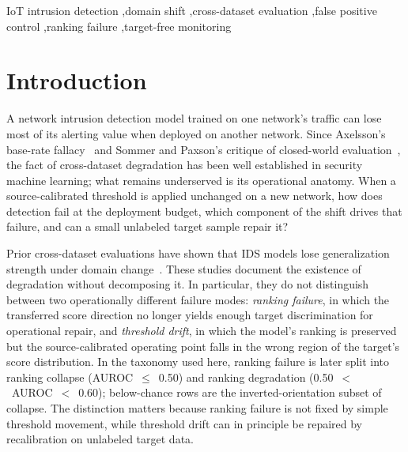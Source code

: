 \documentclass[preprint,12pt]{elsarticle}
\begin{document}
\begin{frontmatter}
\begin{keyword}
IoT intrusion detection \sep domain shift \sep cross-dataset evaluation \sep false positive control \sep ranking failure \sep target-free monitoring
\end{keyword}

\end{frontmatter}

\section{Introduction}

A network intrusion detection model trained on one network's traffic can lose most of its alerting value when deployed on another network. Since Axelsson's base-rate fallacy~\cite{axelsson2000baserate} and Sommer and Paxson's critique of closed-world evaluation~\cite{sommer2010outside}, the fact of cross-dataset degradation has been well established in security machine learning; what remains underserved is its operational anatomy. When a source-calibrated threshold is applied unchanged on a new network, how does detection fail at the deployment budget, which component of the shift drives that failure, and can a small unlabeled target sample repair it?

Prior cross-dataset evaluations have shown that IDS models lose generalization strength under domain change~\cite{dhooge2020inter,layeghy2024benchmarking,iwanowski2025choice}. These studies document the existence of degradation without decomposing it. In particular, they do not distinguish between two operationally different failure modes: \emph{ranking failure}, in which the transferred score direction no longer yields enough target discrimination for operational repair, and \emph{threshold drift}, in which the model's ranking is preserved but the source-calibrated operating point falls in the wrong region of the target's score distribution. In the taxonomy used here, ranking failure is later split into ranking collapse (AUROC~$\leq$~0.50) and ranking degradation (0.50~$<$~AUROC~$<$~0.60); below-chance rows are the inverted-orientation subset of collapse. The distinction matters because ranking failure is not fixed by simple threshold movement, while threshold drift can in principle be repaired by recalibration on unlabeled target data.
\end{document}
